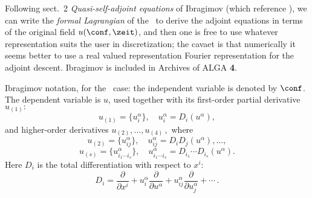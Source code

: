 

Following sect.~2 {\em Quasi-self-adjoint equations} of
Ibragimov (which  reference
),
we can write
the \emph{formal Lagrangian} of the \KSe\ to derive the {\spt}
adjoint equations in terms of the original {\spt} field
$u(\conf,\zeit)$, and then one is free to use whatever representation
suits the user in discretization; the cavaet is that numerically it seems
better to use a real valued representation Fourier representation for the
adjoint descent.
     {Ibragimov is included in
    {Archives of ALGA {\bf 4}}. }

Ibragimov notation, for the \KS\ case: the independent variable is
denoted by $\conf$. The dependent variable is $u$,
used together with its first-order partial derivative
   $u_{(1)}:$
  $$
  u_{(1)} = \{u^\alpha_i\}, \quad u^\alpha_i = D_i (u^\alpha),
  $$
and higher-order derivatives $u_{(2)}, \ldots, u_{(4)}\,,$ where
 $$
  u_{(2)} = \{u^\alpha_{ij}\}, \quad u^\alpha_{ij} = D_i D_j
  (u^\alpha),\ldots,
  $$
  $$
  u_{(s)} = \{u^\alpha_{i_1\cdots i_s}\}, \quad u^\alpha_{i_1\cdots i_s}
  = D_{i_1} \cdots D_{i_s}(u^\alpha).
  $$
  Here $D_i$ is the total differentiation with respect to $x^i:$
 \begin{equation}
 \label{sa:cl.diff1}
  D_i = \frac{\partial}{\partial x^i} +
u^\alpha_{i}\frac{\partial}{\partial u^\alpha} +
u^\alpha_{ij}\frac{\partial}{\partial u^\alpha_j} +
 \cdots\,.
 \end{equation}


